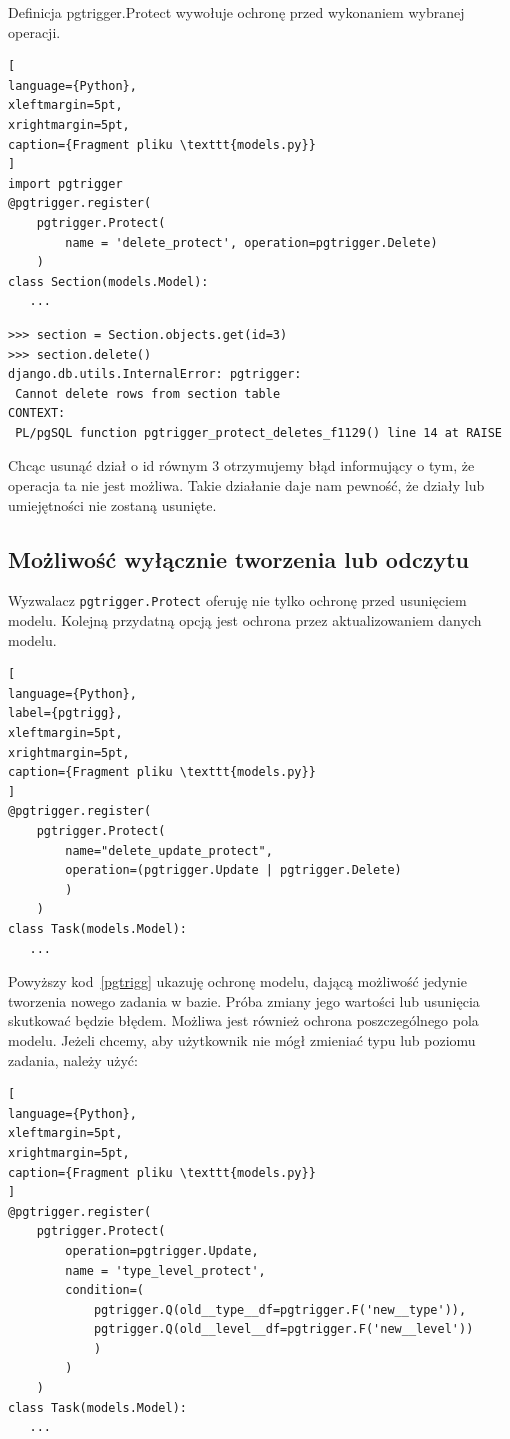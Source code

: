 \documentclass[oneside,polski,logo,indent]{amuthesis}
\begin{document}
Definicja pgtrigger.Protect wywołuje ochronę przed wykonaniem wybranej operacji.
\begin{lstlisting}[
language={Python},
xleftmargin=5pt,
xrightmargin=5pt,
caption={Fragment pliku \texttt{models.py}}
]
import pgtrigger
@pgtrigger.register(
    pgtrigger.Protect(
        name = 'delete_protect', operation=pgtrigger.Delete)
    )
class Section(models.Model):
   ...
\end{lstlisting}
\begin{lstlisting}[style=DOS]
>>> section = Section.objects.get(id=3)
>>> section.delete()
django.db.utils.InternalError: pgtrigger: 
 Cannot delete rows from section table
CONTEXT:  
 PL/pgSQL function pgtrigger_protect_deletes_f1129() line 14 at RAISE
\end{lstlisting}
Chcąc usunąć dział o id równym 3 otrzymujemy błąd informujący o tym, że operacja ta nie jest możliwa. Takie działanie daje nam pewność, że działy lub umiejętności nie zostaną usunięte.
\begin{center}
\subsection{Możliwość wyłącznie tworzenia lub odczytu}
\end{center}

Wyzwalacz \texttt{pgtrigger.Protect} oferuję nie tylko ochronę przed usunięciem modelu. Kolejną przydatną opcją jest ochrona przez aktualizowaniem danych modelu.
\begin{lstlisting}[
language={Python},
label={pgtrigg},
xleftmargin=5pt,
xrightmargin=5pt,
caption={Fragment pliku \texttt{models.py}}
]
@pgtrigger.register(
    pgtrigger.Protect(
        name="delete_update_protect",
        operation=(pgtrigger.Update | pgtrigger.Delete)
        )
    )
class Task(models.Model):
   ...
\end{lstlisting}
Powyższy kod~\ref{pgtrigg} ukazuję ochronę modelu, dającą możliwość jedynie tworzenia nowego zadania w bazie. Próba zmiany jego wartości lub usunięcia skutkować będzie błędem. Możliwa jest również ochrona poszczególnego pola modelu.
Jeżeli chcemy, aby użytkownik nie mógł zmieniać typu lub poziomu zadania, należy użyć:

\begin{lstlisting}[
language={Python},
xleftmargin=5pt,
xrightmargin=5pt,
caption={Fragment pliku \texttt{models.py}}
]
@pgtrigger.register(
    pgtrigger.Protect(
        operation=pgtrigger.Update,
        name = 'type_level_protect',
        condition=(
            pgtrigger.Q(old__type__df=pgtrigger.F('new__type')),
            pgtrigger.Q(old__level__df=pgtrigger.F('new__level'))
            )
        )
    )
class Task(models.Model):
   ...
\end{lstlisting}
\end{document}
